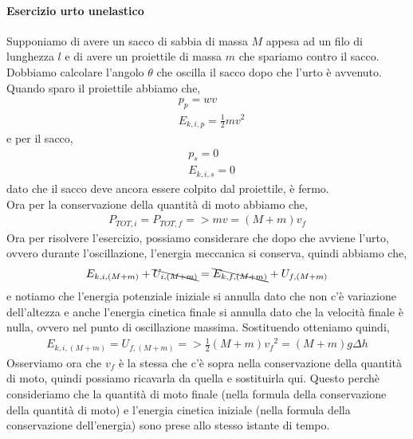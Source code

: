             \paragraph{Esercizio urto unelastico}
                Supponiamo di avere un sacco di sabbia di massa $M$ appesa ad un filo di lunghezza $l$ e di avere un proiettile di massa $m$ che spariamo contro il sacco. Dobbiamo calcolare l'angolo $\theta$ che oscilla il sacco dopo che l'urto è avvenuto.\\
                Quando sparo il proiettile abbiamo che,
                \begin{align*}
                    &p_p = wv\\
                    &E_{k,i,p} =\frac{1}{2}mv^2
                \end{align*}
                e per il sacco,
                \begin{align*}
                    &p_s = 0\\
                    &E_{k,i,s} =0
                \end{align*}
                dato che il sacco deve ancora essere colpito dal proiettile, è fermo.\\
                Ora per la conservazione della quantità di moto abbiamo che,
                \begin{align*}
                    P_{TOT,i}=P_{TOT,f} => mv = (M+m)v_f
                \end{align*}
                Ora per risolvere l'esercizio, possiamo considerare che dopo che avviene l'urto, ovvero durante l'oscillazione, l'energia meccanica si conserva, quindi abbiamo che,
                \begin{align*}
                    E_{k,i,(M+m)} + \bcancel{U_{i,(M+m)}}= \bcancel{E_{k,f,(M+m)}} + U_{f,(M+m)}
                \end{align*}
                e notiamo che l'energia potenziale iniziale si annulla dato che non c'è variazione dell'altezza e anche l'energia cinetica finale si annulla dato che la velocità finale è nulla, ovvero nel punto di oscillazione massima. Sostituendo otteniamo quindi,
                \begin{align*}
                    E_{k,i,(M+m)}=U_{f,(M+m)} =>\frac{1}{2}(M+m){v_f}^2 = (M+m)g\Delta h
                \end{align*}
                Osserviamo ora che $v_f$ è la stessa che c'è sopra nella conservazione della quantità di moto, quindi possiamo ricavarla da quella e sostituirla qui. Questo perchè consideriamo che la quantità di moto finale (nella formula della conservazione della quantità di moto) e l'energia cinetica iniziale (nella formula della conservazione dell'energia) sono prese allo stesso istante di tempo.\\
